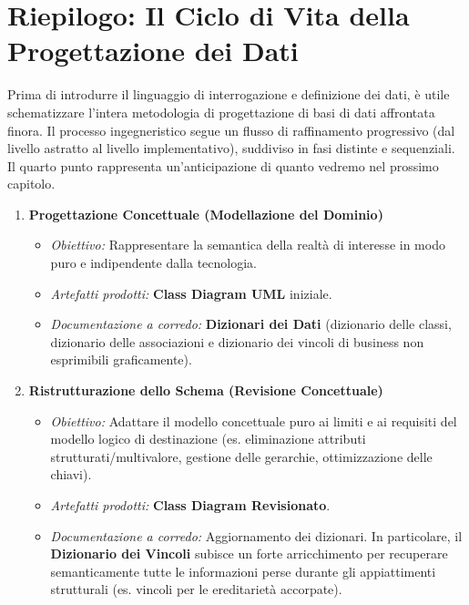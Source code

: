 \section{Riepilogo: Il Ciclo di Vita della Progettazione dei Dati}

Prima di introdurre il linguaggio di interrogazione e definizione dei dati, è utile schematizzare l'intera metodologia di progettazione di basi di dati affrontata finora. Il processo ingegneristico segue un flusso di raffinamento progressivo (dal livello astratto al livello implementativo), suddiviso in fasi distinte e sequenziali. Il quarto punto rappresenta un'anticipazione di quanto vedremo nel prossimo capitolo. 

\begin{enumerate}
    \item \textbf{Progettazione Concettuale (Modellazione del Dominio)}
    \begin{itemize}
        \item \textit{Obiettivo:} Rappresentare la semantica della realtà di interesse in modo puro e indipendente dalla tecnologia.
        \item \textit{Artefatti prodotti:} \textbf{Class Diagram UML} iniziale.
        \item \textit{Documentazione a corredo:} \textbf{Dizionari dei Dati} (dizionario delle classi, dizionario delle associazioni e dizionario dei vincoli di business non esprimibili graficamente).
    \end{itemize}

    \item \textbf{Ristrutturazione dello Schema (Revisione Concettuale)}
    \begin{itemize}
        \item \textit{Obiettivo:} Adattare il modello concettuale puro ai limiti e ai requisiti del modello logico di destinazione (es. eliminazione attributi strutturati/multivalore, gestione delle gerarchie, ottimizzazione delle chiavi).
        \item \textit{Artefatti prodotti:} \textbf{Class Diagram Revisionato}.
        \item \textit{Documentazione a corredo:} Aggiornamento dei dizionari. In particolare, il \textbf{Dizionario dei Vincoli} subisce un forte arricchimento per recuperare semanticamente tutte le informazioni perse durante gli appiattimenti strutturali (es. vincoli per le ereditarietà accorpate).
    \end{itemize}


\end{enumerate}
